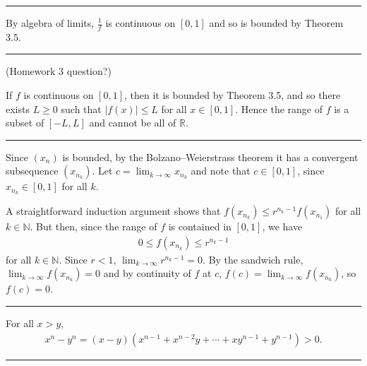 \documentclass[letterpaper,10pt,english]{jupyterBook}
\begin{document}
\bigskip\hrule\bigskip


\sphinxAtStartPar
{\hyperref[\detokenize{Problems:id28}]{}} By algebra of limits, \(\frac{1}{f}\) is continuous on \([0, 1]\) and so is bounded by Theorem 3.5.


\bigskip\hrule\bigskip


\sphinxAtStartPar
{\hyperref[\detokenize{Problems:id29}]{}} (Homework 3 question?)

If \(f\) is continuous on \([0, 1]\), then it is bounded by Theorem 3.5, and so there exists \(L \geq 0\) such that \(|f(x)| \leq L\) for all \(x \in [0, 1]\). Hence the range of \(f\) is a subset of  \([-L, L]\) and cannot be all of \(\mathbb{R}\).


\bigskip\hrule\bigskip


\sphinxAtStartPar
{\hyperref[\detokenize{Problems:id30}]{}} Since \((x_{n})\) is bounded, by the Bolzano–Weierstrass theorem it has a convergent subsequence \((x_{n_{k}})\). Let \(c=\lim_{k \rightarrow \infty}x_{n_{k}}\) and note that \(c \in [0, 1]\), since \(x_{n_k}\in[0,1]\) for all \(k\).

A straight\sphinxhyphen{}forward induction argument shows that \(f(x_{n_{k}}) \leq r^{n_{k}-1}f(x_{n_{1}})\) for all \(k\in\mathbb{N}\). But then, since the range of \(f\) is contained in \([0,1]\), we have
\begin{equation*}
\begin{split}
0 \leq f(x_{n_{k}}) \leq r^{n_{k}-1}
\end{split}
\end{equation*}
\sphinxAtStartPar
for all \(k\in\mathbb{N}\). Since \(r < 1\), \(\lim_{k\to\infty} r^{n_k-1} =0\). By the sandwich rule, \( \lim_{k \rightarrow \infty}f(x_{n_{k}}) = 0\) and by continuity of \(f\) at \(c\), \(f(c) = \lim_{k \rightarrow \infty}f(x_{n_{k}})\), so \(f(c)=0\).


\bigskip\hrule\bigskip


\sphinxAtStartPar
{\hyperref[\detokenize{Problems:id31}]{}} For all \(x > y\),
\begin{equation*}
\begin{split}
x^{n} - y^{n} = (x - y)(x^{n-1} + x^{n-2}y + \cdots + xy^{n-1} + y^{n-1}) > 0.
\end{split}
\end{equation*}

\bigskip\hrule\bigskip
\end{document}
